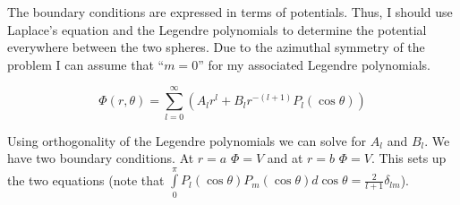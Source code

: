 \begin{homeworkProblem}



The boundary conditions are expressed in terms of potentials. Thus, I should use Laplace's equation and the Legendre polynomials to determine the potential everywhere between the two spheres. Due to the azimuthal symmetry of the problem I can assume that ``$m = 0$'' for my associated Legendre polynomials.

\[
\Phi(r,\theta) = \sum\limits_{l = 0}^{\infty} \left( A_l r^l + B_l r^{-(l+1)} P_l(\cos\theta) \right)
\]

Using orthogonality of the Legendre polynomials we can solve for $A_l$ and $B_l$. We have two boundary conditions. At $r = a$ $\Phi = V$ and at $r = b$ $\Phi = V$. This sets up the two equations (note that $\int\limits_0^\pi P_l(\cos \theta)P_m(\cos \theta) d\cos\theta = \frac{2}{l + 1} \delta_{l m}$).

\end{homeworkProblem}